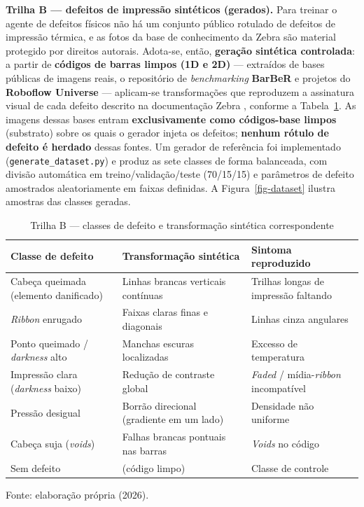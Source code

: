 \documentclass[
	article,			%
	11pt,				%
	oneside,			%
	a4paper,			%
	english,			%
	brazilian,			%
	sumario=tradicional
	]{abntex2}
\begin{document}
\noindent\textbf{Trilha B --- defeitos de impressão sintéticos (gerados).} Para
treinar o agente de defeitos físicos não há um conjunto público rotulado de
defeitos de impressão térmica, e as fotos da base de conhecimento da Zebra são
material protegido por direitos autorais. Adota-se, então, \textbf{geração
sintética controlada}: a partir de \textbf{códigos de barras limpos (1D e 2D)}
--- extraídos de bases públicas de imagens reais, o repositório de
\textit{benchmarking} \textbf{BarBeR} \cite{2024ICPR_barber,2025EAAI} e projetos
do \textbf{Roboflow Universe} \cite{roboflow_barcode} --- aplicam-se
transformações que reproduzem a assinatura visual de cada defeito descrito na
documentação Zebra \cite{zebra_printquality}, conforme a Tabela~\ref{tab-trilhaB}.
As imagens dessas bases entram \textbf{exclusivamente como códigos-base limpos}
(substrato) sobre os quais o gerador injeta os defeitos; \textbf{nenhum rótulo de
defeito é herdado} dessas fontes.
Um gerador de referência foi implementado (\texttt{generate\_dataset.py}) e produz as
sete classes de forma balanceada, com divisão automática em treino/validação/teste
(70/15/15) e parâmetros de defeito amostrados aleatoriamente em faixas definidas.
A Figura~\ref{fig-dataset} ilustra amostras das classes geradas.

\begin{table}[htb]
\centering
\caption{Trilha B --- classes de defeito e transformação sintética correspondente}
\label{tab-trilhaB}
\begin{tabular}{@{}p{4.6cm}p{5.0cm}p{4.0cm}@{}}
\toprule
\textbf{Classe de defeito} & \textbf{Transformação sintética} & \textbf{Sintoma reproduzido}\\
\midrule
Cabeça queimada (elemento danificado) & Linhas brancas verticais contínuas &
Trilhas longas de impressão faltando\\
\textit{Ribbon} enrugado & Faixas claras finas e diagonais & Linhas cinza angulares\\
Ponto queimado / \textit{darkness} alto & Manchas escuras localizadas &
Excesso de temperatura\\
Impressão clara (\textit{darkness} baixo) & Redução de contraste global &
\textit{Faded} / mídia-\textit{ribbon} incompatível\\
Pressão desigual & Borrão direcional (gradiente em um lado) & Densidade não uniforme\\
Cabeça suja (\textit{voids}) & Falhas brancas pontuais nas barras & \textit{Voids} no código\\
Sem defeito & (código limpo) & Classe de controle\\
\bottomrule
\end{tabular}

\vspace{2pt}
{\footnotesize Fonte: elaboração própria (2026).}
\end{table}
\end{document}
